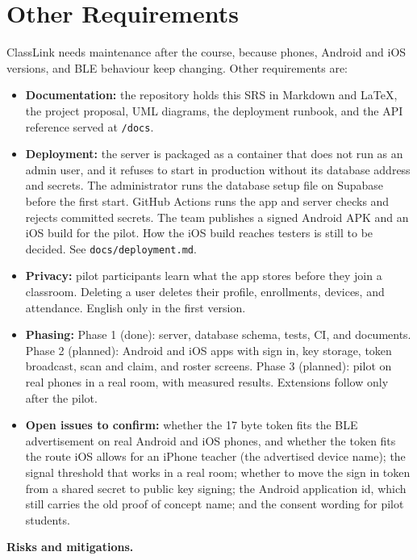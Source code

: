 \hypertarget{other-requirements}{%
\section{Other Requirements}\label{other-requirements}}

ClassLink needs maintenance after the course, because phones, Android and iOS versions, and BLE behaviour keep changing. Other requirements are:

\begin{itemize}
\tightlist
\item
  \textbf{Documentation:} the repository holds this SRS in Markdown and LaTeX, the project proposal, UML diagrams, the deployment runbook, and the API reference served at \texttt{/docs}.
\item
  \textbf{Deployment:} the server is packaged as a container that does not run as an admin user, and it refuses to start in production without its database address and secrets. The administrator runs the database setup file on Supabase before the first start. GitHub Actions runs the app and server checks and rejects committed secrets. The team publishes a signed Android APK and an iOS build for the pilot. How the iOS build reaches testers is still to be decided. See \texttt{docs/deployment.md}.
\item
  \textbf{Privacy:} pilot participants learn what the app stores before they join a classroom. Deleting a user deletes their profile, enrollments, devices, and attendance. English only in the first version.
\item
  \textbf{Phasing:} Phase 1 (done): server, database schema, tests, CI, and documents. Phase 2 (planned): Android and iOS apps with sign in, key storage, token broadcast, scan and claim, and roster screens. Phase 3 (planned): pilot on real phones in a real room, with measured results. Extensions follow only after the pilot.
\item
  \textbf{Open issues to confirm:} whether the 17 byte token fits the BLE advertisement on real Android and iOS phones, and whether the token fits the route iOS allows for an iPhone teacher (the advertised device name); the signal threshold that works in a real room; whether to move the sign in token from a shared secret to public key signing; the Android application id, which still carries the old proof of concept name; and the consent wording for pilot students.
\end{itemize}

\textbf{Risks and mitigations.}

